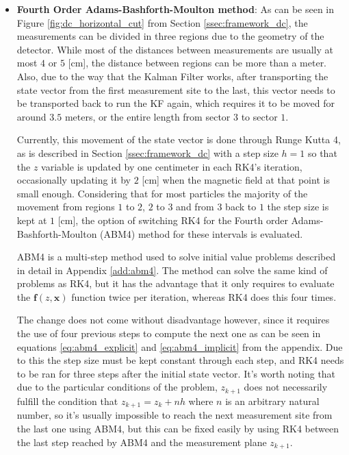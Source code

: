     \begin{itemize}
        \item \textbf{Fourth Order Adams-Bashforth-Moulton method}: As can be seen in Figure \ref{fig:dc_horizontal_cut} from Section \ref{ssec:framework_dc}, the measurements can be divided in three regions due to the geometry of the detector.
        While most of the distances between measurements are usually at most $4$ or $5$ [cm], the distance between regions can be more than a meter.
        Also, due to the way that the Kalman Filter works, after transporting the state vector from the first measurement site to the last, this vector needs to be transported back to run the KF again, which requires it to be moved for around $3.5$ meters, or the entire length from sector $3$ to sector $1$.
    
\newpage

        Currently, this movement of the state vector is done through Runge Kutta 4, as is described in Section \ref{ssec:framework_dc} with a step size $h=1$ so that the $z$ variable is updated by one centimeter in each RK4's iteration, occasionally updating it by $2$ [cm] when the magnetic field at that point is small enough.
        Considering that for most particles the majority of the movement from regions $1$ to $2$, $2$ to $3$ and from $3$ back to $1$ the step size is kept at $1$ [cm], the option of switching RK4 for the Fourth order Adams-Bashforth-Moulton (ABM4) method for these intervals is evaluated.

        ABM4 is a multi-step method used to solve initial value problems described in detail in Appendix \ref{add:abm4}.
        The method can solve the same kind of problems as RK4, but it has the advantage that it only requires to evaluate the $\mathbf{f}(z,\mathbf{x})$ function twice per iteration, whereas RK4 does this four times.

        The change does not come without disadvantage however, since it requires the use of four previous steps to compute the next one as can be seen in equations \eqref{eq:abm4_explicit} and \eqref{eq:abm4_implicit} from the appendix.
        Due to this the step size must be kept constant through each step, and RK4 needs to be ran for three steps after the initial state vector.
        It's worth noting that due to the particular conditions of the problem, $z_{k+1}$ does not necessarily fulfill the condition that $z_{k+1} = z_k + n h$ where $n$ is an arbitrary natural number, so it's usually impossible to reach the next measurement site from the last one using ABM4, but this can be fixed easily by using RK4 between the last step reached by ABM4 and the measurement plane $z_{k+1}$.


\end{itemize}
